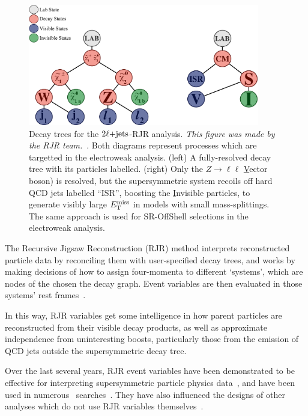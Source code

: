 \begin{figure}[tp]
\centering
\includegraphics[width=0.9\textwidth]{figures/2ljets_rjr_trees.pdf}
\caption{%
Decay trees for the $2\ell\mathrm{+jets}$-RJR analysis.
\emph{This figure was made by the RJR team.}~\cite{atlas2022searches}.
Both diagrams represent processes which are targetted in the electroweak
analysis.
(left) A fully-resolved decay tree with its particles labelled.
(right) Only the $Z\rightarrow\ell\ell$ \underline{V}ector boson)
is resolved, but the supersymmetric system recoils off
hard QCD jets labelled ``ISR'', boosting the \underline{I}nvisible particles,
to generate visibly large $E_\mathrm{T}^\mathrm{miss}$ in models with small mass-splittings.
The same approach is used for SR-OffShell selections in the electroweak
analysis.
}
\label{fig:2ljets_rjr_decay_trees}
\end{figure}

The Recursive Jigsaw Reconstruction (RJR) method interprets reconstructed
particle data by reconciling them with user-specified decay trees, and works
by making decisions of how to assign four-momenta to different `systems',
which are nodes of the chosen the decay graph.
Event variables are then evaluated in those systems' rest
frames~\cite{jackson2017sparticles, jackson2017rjr}.

In this way, RJR variables get some intelligence in how parent particles are
reconstructed from their visible decay products, as well as approximate
independence from uninteresting boosts, particularly those from the emission of
QCD jets outside the supersymmetric decay tree.

Over the last several years, RJR event variables have been demonstrated to be
effective for interpreting supersymmetric particle physics
data~\cite{santoni2018probing},
and have been used in numerous \atlas\ searches~\cite{%
atlas_rjr_SUSY_2016_07,
atlas_rjr_SUSY_2016_15,
atlas_rjr_SUSY_2016_16,
atlas_rjr_23l_SUSY_2017_03,
atlas_rjr_SUSY_2018_12,
atlas_rjr_EXOT_2019_19,
atlas_rjr_3l_SUSY_2019_09
}.
They have also influenced the designs of other analyses which do not use
RJR variables themselves~\cite{atlas_rjr_mimic_SUSY_2018_06}.


